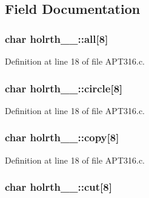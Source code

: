 \subsection{Field Documentation}
\subsubsection[{\texorpdfstring{all}{all}}]{\setlength{\rightskip}{0pt plus 5cm}char holrth\+\_\+\_\+\+::all\mbox{[}8\mbox{]}}\hypertarget{structholrth__1___aea8a206994514a9403a792499928c345}{}\label{structholrth__1___aea8a206994514a9403a792499928c345}


Definition at line 18 of file A\+P\+T316.\+c.

\subsubsection[{\texorpdfstring{circle}{circle}}]{\setlength{\rightskip}{0pt plus 5cm}char holrth\+\_\+\_\+\+::circle\mbox{[}8\mbox{]}}\hypertarget{structholrth__1___a1db55898de24c29a18cf8e64d7800337}{}\label{structholrth__1___a1db55898de24c29a18cf8e64d7800337}


Definition at line 18 of file A\+P\+T316.\+c.

\subsubsection[{\texorpdfstring{copy}{copy}}]{\setlength{\rightskip}{0pt plus 5cm}char holrth\+\_\+\_\+\+::copy\mbox{[}8\mbox{]}}\hypertarget{structholrth__1___ad3a33df9882828132af2cbd01838aaad}{}\label{structholrth__1___ad3a33df9882828132af2cbd01838aaad}


Definition at line 18 of file A\+P\+T316.\+c.

\subsubsection[{\texorpdfstring{cut}{cut}}]{\setlength{\rightskip}{0pt plus 5cm}char holrth\+\_\+\_\+\+::cut\mbox{[}8\mbox{]}}\hypertarget{structholrth__1___a83821b1fc5d105782596df52958257c1}{}\label{structholrth__1___a83821b1fc5d105782596df52958257c1}


